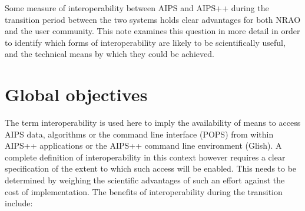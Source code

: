  Some measure of interoperability between AIPS and AIPS++ during the
transition period between the two systems holds clear advantages for
both NRAO and the user community. This note examines this question in
more detail in order to identify which forms of interoperability are
likely to be scientifically useful, and the technical means by which
they could be achieved.

\section{Global objectives}

 The term interoperability is used here to imply the availability of
means to access AIPS data, algorithms or the command line interface
(POPS) from within AIPS++ applications or the AIPS++ command line
environment (Glish). A complete definition of interoperability in this
context however requires a clear specification of the extent to which
such access will be enabled. This needs to be determined by weighing
the scientific advantages of such an effort against the cost of
implementation.  The benefits of interoperability during the
transition include:


